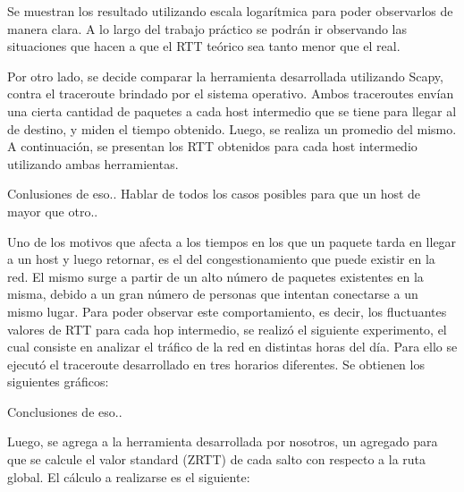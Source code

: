 Se muestran los resultado utilizando escala logarítmica para poder observarlos de manera clara. A lo largo del trabajo práctico se podrán ir observando las situaciones que hacen a que el RTT teórico sea tanto menor que el real.

Por otro lado, se decide comparar la herramienta desarrollada utilizando Scapy, contra el traceroute brindado por el sistema operativo. Ambos traceroutes envían una cierta cantidad de paquetes a cada host intermedio que se tiene para llegar al de destino, y miden el tiempo obtenido. Luego, se realiza un promedio del mismo. A continuación, se presentan los RTT obtenidos para cada host intermedio utilizando ambas herramientas. 





Conlusiones de eso..
Hablar de todos los casos posibles para que un host de mayor que otro..

Uno de los motivos que afecta a los tiempos en los que un paquete tarda en llegar a un host y luego retornar, es el del congestionamiento que puede existir en la red. El mismo surge a partir de un alto número de paquetes existentes en la misma, debido a un gran número de personas que intentan conectarse a un mismo lugar. Para poder observar este comportamiento, es decir, los fluctuantes valores de RTT para cada hop intermedio, se realizó el siguiente experimento, el cual consiste en analizar el tráfico de la red en distintas horas del día. Para ello se ejecutó el traceroute desarrollado en tres horarios diferentes. Se obtienen los siguientes gráficos:





Conclusiones de eso..

Luego, se agrega a la herramienta desarrollada por nosotros, un agregado para que se calcule el valor standard (ZRTT) de cada salto con respecto a la ruta global. El cálculo a realizarse es el siguiente:

